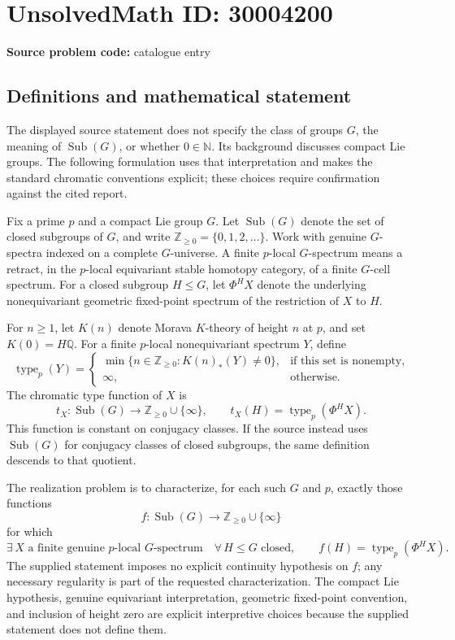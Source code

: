 \documentclass[11pt]{article}
\begin{document}
\section*{UnsolvedMath ID: 30004200}
\textbf{Source problem code:} catalogue entry
\subsection{Definitions and mathematical statement}
The displayed source statement does not specify the class of groups \(G\), the meaning of \(\operatorname{Sub}(G)\), or whether \(0\in\mathbb N\). Its background discusses compact Lie groups. The following formulation uses that interpretation and makes the standard chromatic conventions explicit; these choices require confirmation against the cited report.

Fix a prime \(p\) and a compact Lie group \(G\). Let \(\operatorname{Sub}(G)\) denote the set of closed subgroups of \(G\), and write \(\mathbb Z_{\geq 0}=\{0,1,2,\ldots\}\). Work with genuine \(G\)-spectra indexed on a complete \(G\)-universe. A finite \(p\)-local \(G\)-spectrum means a retract, in the \(p\)-local equivariant stable homotopy category, of a finite \(G\)-cell spectrum. For a closed subgroup \(H\leq G\), let \(\Phi^H X\) denote the underlying nonequivariant geometric fixed-point spectrum of the restriction of \(X\) to \(H\).

For \(n\geq 1\), let \(K(n)\) denote Morava \(K\)-theory of height \(n\) at \(p\), and set \(K(0)=H\mathbb Q\). For a finite \(p\)-local nonequivariant spectrum \(Y\), define
\[
\operatorname{type}_p(Y)=
\begin{cases}
\min\{n\in\mathbb Z_{\geq 0}:K(n)_*(Y)\neq 0\},&\text{if this set is nonempty},\\
\infty,&\text{otherwise}.
\end{cases}
\]
The chromatic type function of \(X\) is
\[
 t_X\colon\operatorname{Sub}(G)\longrightarrow\mathbb Z_{\geq 0}\cup\{\infty\},
 \qquad t_X(H)=\operatorname{type}_p(\Phi^H X).
\]
This function is constant on conjugacy classes. If the source instead uses \(\operatorname{Sub}(G)\) for conjugacy classes of closed subgroups, the same definition descends to that quotient.

The realization problem is to characterize, for each such \(G\) and \(p\), exactly those functions
\[
 f\colon\operatorname{Sub}(G)\longrightarrow\mathbb Z_{\geq 0}\cup\{\infty\}
\]
for which
\[
 \exists\,X\text{ a finite genuine }p\text{-local }G\text{-spectrum}\quad
 \forall\,H\leq G\text{ closed},\qquad
 f(H)=\operatorname{type}_p(\Phi^H X).
\]
The supplied statement imposes no explicit continuity hypothesis on \(f\); any necessary regularity is part of the requested characterization. The compact Lie hypothesis, genuine equivariant interpretation, geometric fixed-point convention, and inclusion of height zero are explicit interpretive choices because the supplied statement does not define them.
\end{document}
